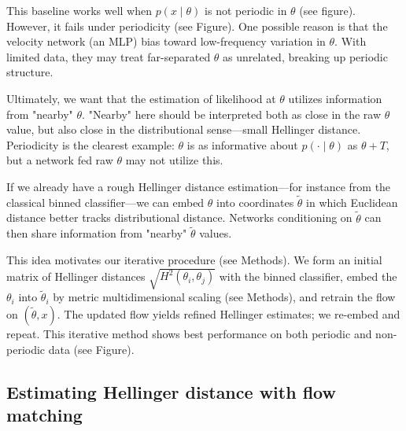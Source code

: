 This baseline works well when $p(x \mid \theta)$ is not periodic in $\theta$ (see figure). However, it fails under periodicity (see Figure). One possible reason is that the velocity network (an MLP) bias toward low-frequency variation in $\theta$. With limited data, they may treat far-separated $\theta$ as unrelated, breaking up periodic structure.

Ultimately, we want that the estimation of likelihood at $\theta$ utilizes information from "nearby" $\theta$. "Nearby" here should be interpreted both as close in the raw $\theta$ value, but also close in the distributional sense---small Hellinger distance. Periodicity is the clearest example: $\theta$ is as informative about $p(\cdot \mid \theta)$ as $\theta + T$, but a network fed raw $\theta$ may not utilize this.

If we already have a rough Hellinger distance estimation---for instance from the classical binned classifier---we can embed $\theta$ into coordinates $\tilde{\theta}$ in which Euclidean distance better tracks distributional distance. Networks conditioning on $\tilde{\theta}$ can then share information from "nearby" $\tilde{\theta}$ values.

This idea motivates our iterative procedure (see Methods). We form an initial matrix of Hellinger distances $\sqrt{H^2(\theta_i, \theta_j)}$ with the binned classifier, embed the $\theta_i$ into $\tilde{\theta}_i$ by metric multidimensional scaling (see Methods), and retrain the flow on $(\tilde{\theta}, x)$. The updated flow yields refined Hellinger estimates; we re-embed and repeat. This iterative method shows best performance on both periodic and non-periodic data (see Figure).

\subsection{Estimating Hellinger distance with flow matching}

